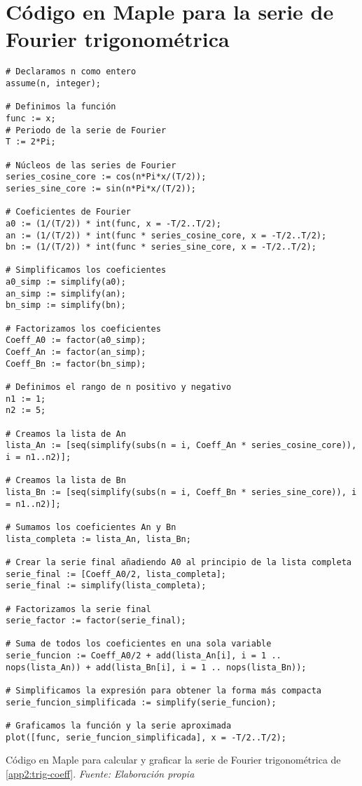 \section{Código en Maple para la serie de Fourier trigonométrica}\label{app3:trig-code-maple}
\begin{longlisting}
	\begin{verbatim}
# Declaramos n como entero
assume(n, integer);

# Definimos la función
func := x;
# Periodo de la serie de Fourier
T := 2*Pi;

# Núcleos de las series de Fourier
series_cosine_core := cos(n*Pi*x/(T/2));
series_sine_core := sin(n*Pi*x/(T/2));

# Coeficientes de Fourier
a0 := (1/(T/2)) * int(func, x = -T/2..T/2);
an := (1/(T/2)) * int(func * series_cosine_core, x = -T/2..T/2);
bn := (1/(T/2)) * int(func * series_sine_core, x = -T/2..T/2);

# Simplificamos los coeficientes
a0_simp := simplify(a0);
an_simp := simplify(an);
bn_simp := simplify(bn);

# Factorizamos los coeficientes
Coeff_A0 := factor(a0_simp);
Coeff_An := factor(an_simp);
Coeff_Bn := factor(bn_simp);

# Definimos el rango de n positivo y negativo
n1 := 1;
n2 := 5;

# Creamos la lista de An
lista_An := [seq(simplify(subs(n = i, Coeff_An * series_cosine_core)), i = n1..n2)];

# Creamos la lista de Bn
lista_Bn := [seq(simplify(subs(n = i, Coeff_Bn * series_sine_core)), i = n1..n2)];

# Sumamos los coeficientes An y Bn
lista_completa := lista_An, lista_Bn;

# Crear la serie final añadiendo A0 al principio de la lista completa
serie_final := [Coeff_A0/2, lista_completa];
serie_final := simplify(lista_completa);

# Factorizamos la serie final
serie_factor := factor(serie_final);

# Suma de todos los coeficientes en una sola variable
serie_funcion := Coeff_A0/2 + add(lista_An[i], i = 1 .. nops(lista_An)) + add(lista_Bn[i], i = 1 .. nops(lista_Bn));

# Simplificamos la expresión para obtener la forma más compacta
serie_funcion_simplificada := simplify(serie_funcion);

# Graficamos la función y la serie aproximada
plot([func, serie_funcion_simplificada], x = -T/2..T/2);	
	\end{verbatim}
	\caption[Código en Maple para calcular y graficar la serie de Fourier trigonométrica de \ref{app2:trig-coeff}.] {Código en Maple para calcular y graficar la serie de Fourier trigonométrica de \ref{app2:trig-coeff}. \textit{Fuente: Elaboración propia}} 
\end{longlisting}


